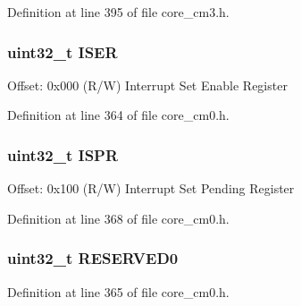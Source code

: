 Definition at line 395 of file core\+\_\+cm3.\+h.

\subsubsection[{\texorpdfstring{I\+S\+ER}{ISER}}]{ uint32\+\_\+t I\+S\+ER}\hypertarget{struct_n_v_i_c___type_a1f970af55366c7caaf51407309f304db}{}\label{struct_n_v_i_c___type_a1f970af55366c7caaf51407309f304db}
Offset\+: 0x000 (R/W) Interrupt Set Enable Register 

Definition at line 364 of file core\+\_\+cm0.\+h.

\subsubsection[{\texorpdfstring{I\+S\+PR}{ISPR}}]{ uint32\+\_\+t I\+S\+PR}\hypertarget{struct_n_v_i_c___type_aecb96022a2971ea637c06798bd131e91}{}\label{struct_n_v_i_c___type_aecb96022a2971ea637c06798bd131e91}
Offset\+: 0x100 (R/W) Interrupt Set Pending Register 

Definition at line 368 of file core\+\_\+cm0.\+h.

\subsubsection[{\texorpdfstring{R\+E\+S\+E\+R\+V\+E\+D0}{RESERVED0}}]{\setlength{\rightskip}{0pt plus 5cm}uint32\+\_\+t R\+E\+S\+E\+R\+V\+E\+D0}\hypertarget{struct_n_v_i_c___type_a99ed1d1bbc9e85b465fb29f40f37aa3a}{}\label{struct_n_v_i_c___type_a99ed1d1bbc9e85b465fb29f40f37aa3a}


Definition at line 365 of file core\+\_\+cm0.\+h.


